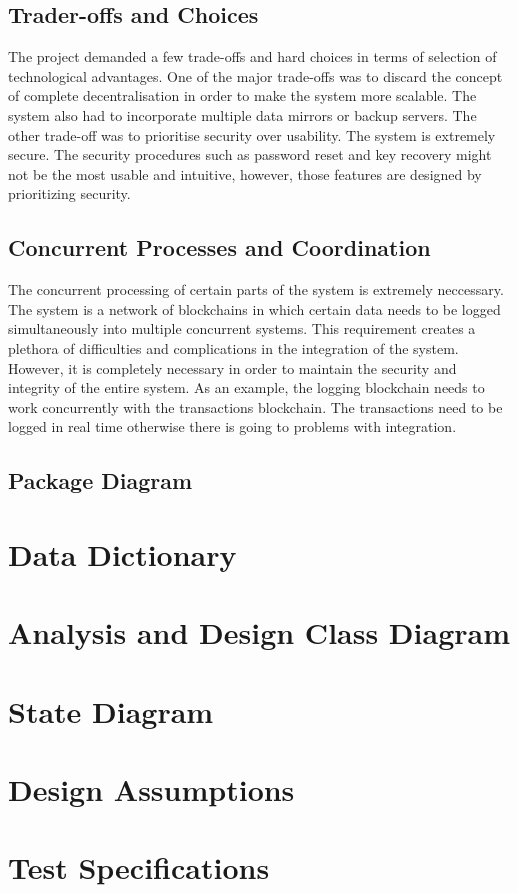 \documentclass[a4paper,twoside,phd]{BYUPhys}
\begin{document}
\subsection{Trader-offs and Choices}
The project demanded a few trade-offs and hard choices in terms of selection of technological advantages. One of the major trade-offs was to discard the concept of complete decentralisation in order to make the system more scalable. The system also had to incorporate multiple data mirrors or backup servers. The other trade-off was to prioritise security over usability. The system is extremely secure. The security procedures such as password reset and key recovery might not be the most usable and intuitive, however, those features are designed by prioritizing security.
\subsection{Concurrent Processes and Coordination}
The concurrent processing of certain parts of the system is extremely neccessary. The system is a network of blockchains in which certain data needs to be logged simultaneously into multiple concurrent systems. This requirement creates a plethora of difficulties and complications in the integration of the system. However, it is completely necessary in order to maintain the security and integrity of the entire system. As an example, the logging blockchain needs to work concurrently with the transactions blockchain. The transactions need to be logged in real time otherwise there is going to problems with integration.
\subsection{Package Diagram}
\section{Data Dictionary}
\section{Analysis and Design Class Diagram}
\section{State Diagram}
\section{Design Assumptions}
\section{Test Specifications}
\end{document}
